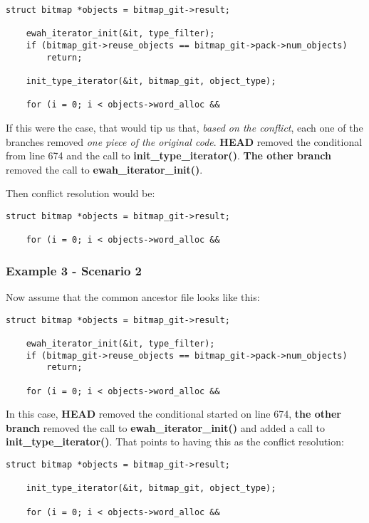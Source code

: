 \begin{lstlisting}[style=c_style, firstnumber=671, caption={\bf example 3} - Scenario 1 - common ancestor code]
	struct bitmap *objects = bitmap_git->result;

	ewah_iterator_init(&it, type_filter);
	if (bitmap_git->reuse_objects == bitmap_git->pack->num_objects)
		return;

	init_type_iterator(&it, bitmap_git, object_type);

	for (i = 0; i < objects->word_alloc &&
\end{lstlisting}

If this were the case, that would tip us that, {\it based on the conflict}, each one of the branches removed {\it one piece of 
the original code}. {\bf HEAD} removed the conditional from line 674 and the call to {\bf init\_type\_iterator()}. {\bf The
other branch} removed the call to {\bf ewah\_iterator\_init()}.

Then conflict resolution would be:
\begin{lstlisting}[style=c_style, firstnumber=671, caption={\bf example 3} - Scenario 1 - conflict resolution]
	struct bitmap *objects = bitmap_git->result;

	for (i = 0; i < objects->word_alloc &&
\end{lstlisting}

\subsubsection{Example 3 - Scenario 2}
Now assume that the common ancestor file looks like this:

\begin{lstlisting}[style=c_style, firstnumber=671, caption={\bf example 3} - Scenario 2 - common ancestor code]
	struct bitmap *objects = bitmap_git->result;

	ewah_iterator_init(&it, type_filter);
	if (bitmap_git->reuse_objects == bitmap_git->pack->num_objects)
		return;

	for (i = 0; i < objects->word_alloc &&
\end{lstlisting}

In this case, {\bf HEAD} removed the conditional started on line 674, {\bf the other branch} removed the call to
{\bf ewah\_iterator\_init()} and added a call to {\bf init\_type\_iterator()}. That points to having this as the conflict resolution:

\begin{lstlisting}[style=c_style, firstnumber=671, caption={\bf example 3} - Scenario 2 - conflict resolution]
	struct bitmap *objects = bitmap_git->result;

	init_type_iterator(&it, bitmap_git, object_type);

	for (i = 0; i < objects->word_alloc &&
\end{lstlisting}

